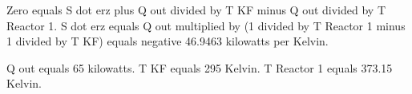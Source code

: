 Zero equals S dot erz plus Q out divided by T KF minus Q out divided by T Reactor 1.  
S dot erz equals Q out multiplied by (1 divided by T Reactor 1 minus 1 divided by T KF) equals negative 46.9463 kilowatts per Kelvin.  

Q out equals 65 kilowatts.  
T KF equals 295 Kelvin.  
T Reactor 1 equals 373.15 Kelvin.
